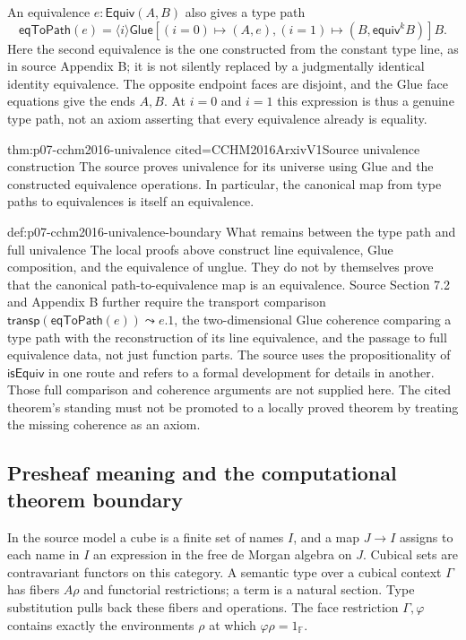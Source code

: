 An equivalence \(e:\mathsf{Equiv}(A,B)\) also gives a type path
\[
 \mathsf{eqToPath}(e)=
 \langle i\rangle\mathsf{Glue}
 [(i=0)\mapsto(A,e),(i=1)\mapsto(B,\mathsf{equiv}^{k}B)]B .
\]
Here the second equivalence is the one constructed from the constant
type line, as in source Appendix B; it is not silently replaced by a
judgmentally identical identity equivalence.  The opposite endpoint
faces are disjoint, and the Glue face equations give the ends \(A,B\).
At \(i=0\) and \(i=1\) this expression is thus a genuine type path,
not an axiom asserting that every equivalence already is equality.

\begin{hbtheorem}{thm:p07-cchm2016-univalence}
 {cited=CCHM2016ArxivV1}{Source univalence construction}
The source proves univalence for its universe using Glue and the
constructed equivalence operations.  In particular, the canonical
map from type paths to equivalences is itself an equivalence.
\end{hbtheorem}

\begin{proofboundary}{def:p07-cchm2016-univalence-boundary}
 {What remains between the type path and full univalence}
The local proofs above construct line equivalence, Glue composition,
and the equivalence of unglue.  They do not by themselves prove that
the canonical path-to-equivalence map is an equivalence.  Source
Section 7.2 and Appendix B further require the transport comparison
\(\mathsf{transp}(\mathsf{eqToPath}(e))\leadsto e.1\), the
two-dimensional Glue coherence comparing a type path with the
reconstruction of its line equivalence, and the passage to full
equivalence data, not just function parts.  The source uses the
propositionality of \(\mathsf{isEquiv}\) in one route and refers to a
formal development for details in another.  Those full comparison
and coherence arguments are not supplied here.  The cited theorem's
standing must not be promoted to a locally proved theorem by treating
the missing coherence as an axiom.
\end{proofboundary}


\subsection{Presheaf meaning and the computational theorem boundary}
\label{sec:p07-cchm2016-semantics}

In the source model a cube is a finite set of names \(I\), and a map
\(J\to I\) assigns to each name in \(I\) an expression in the free
de Morgan algebra on \(J\).  Cubical sets are contravariant functors
on this category.  A semantic type over a cubical context \(\Gamma\)
has fibers \(A\rho\) and functorial restrictions; a term is a natural
section.  Type substitution pulls back these fibers and operations.
The face restriction \(\Gamma,\varphi\) contains exactly the
environments \(\rho\) at which \(\varphi\rho=1_{\mathbb F}\).

